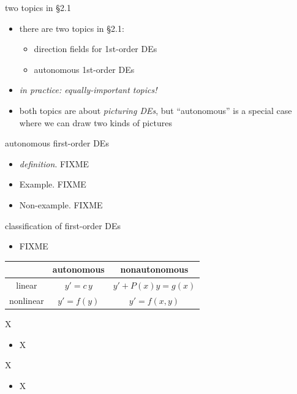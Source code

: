 \documentclass{beamer}
\begin{document}
\begin{frame}{two topics in \S 2.1}

\begin{itemize}
\item there are two topics in \S 2.1:
    \begin{itemize}
    \item direction fields for 1st-order DEs
    \item autonomous 1st-order DEs
    \end{itemize}
\item \emph{in practice: equally-important topics!}
\item both topics are about \emph{picturing DEs}, but ``autonomous'' is a special case where we can draw two kinds of pictures
\end{itemize}
\end{frame}


\begin{frame}{autonomous first-order DEs}

\begin{itemize}
\item \emph{definition}. FIXME
\item Example.  FIXME
\item Non-example.  FIXME
\end{itemize}
\end{frame}


\begin{frame}{classification of first-order DEs}

\begin{itemize}
\item  FIXME
\end{itemize}
\begin{tabular}{c|c|c}
 & autonomous & nonautonomous \\ \hline
linear \Large\strut & $y' = c\, y$ & $y' + P(x) y = g(x)$ \\ \hline
nonlinear \Large\strut & $y' = f(y)$ & $y'=f(x,y)$
\end{tabular}
\end{frame}


\begin{frame}{X}

\begin{itemize}
\item X
\end{itemize}
\end{frame}


\begin{frame}{X}

\begin{itemize}
\item X
\end{itemize}
\end{frame}
\end{document}

